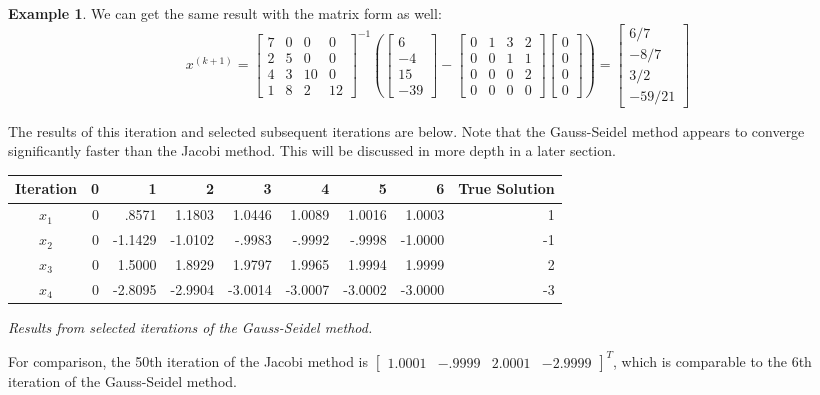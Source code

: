 \documentclass[12pt,letterpaper]{article}
\theoremstyle{definition}
\newtheorem{example}[thm]{Example}
\begin{document}
\begin{example}
We can get the same result with the matrix form as well:
\begin{equation*}
    x^{(k+1)}=\begin{bmatrix}
    7 & 0 & 0 & 0\\
    2 & 5 & 0 & 0\\
    4 & 3 & 10 & 0\\
    1 & 8 & 2 & 12
    \end{bmatrix}^{-1}\left(  \begin{bmatrix}6\\-4\\15\\-39\end{bmatrix} -\begin{bmatrix}
    0 & 1 & 3 & 2\\
    0 & 0 & 1 & 1\\
    0 & 0 & 0 & 2\\
    0 & 0 & 0 & 0
    \end{bmatrix}\begin{bmatrix}
0\\0\\0\\0
\end{bmatrix}\right)=\begin{bmatrix}
6/7\\-8/7\\3/2\\-59/21
\end{bmatrix}
\end{equation*}

The results of this iteration and selected subsequent iterations are below. Note that the Gauss-Seidel method appears to converge significantly faster than the Jacobi method. This will be discussed in more depth in a later section.\\

\begin{tabular}{crrrrrrrr}
     \toprule
    Iteration & 0 & 1 & 2 & 3 & 4 & 5 & 6 & True Solution \\
    \midrule
    $x_1$ & 0 & .8571 & 1.1803 & 1.0446 & 1.0089 & 1.0016 & 1.0003 & 1\\
    $x_2$ & 0 & -1.1429 & -1.0102 & -.9983 & -.9992 & -.9998 & -1.0000 & -1\\
    $x_3$ & 0 & 1.5000 & 1.8929 & 1.9797 & 1.9965 & 1.9994 & 1.9999 & 2\\
    $x_4$ & 0 & -2.8095 & -2.9904 & -3.0014 & -3.0007 & -3.0002 & -3.0000 & -3\\
    \bottomrule
\end{tabular}
\begin{center}
    \it Results from selected iterations of the Gauss-Seidel method.
\end{center}
For comparison, the 50th iteration of the Jacobi method is $\begin{bmatrix}1.0001&-.9999&2.0001&-2.9999\end{bmatrix}^T$, which is comparable to the 6th iteration of the Gauss-Seidel method.

\end{example}
\end{document}
